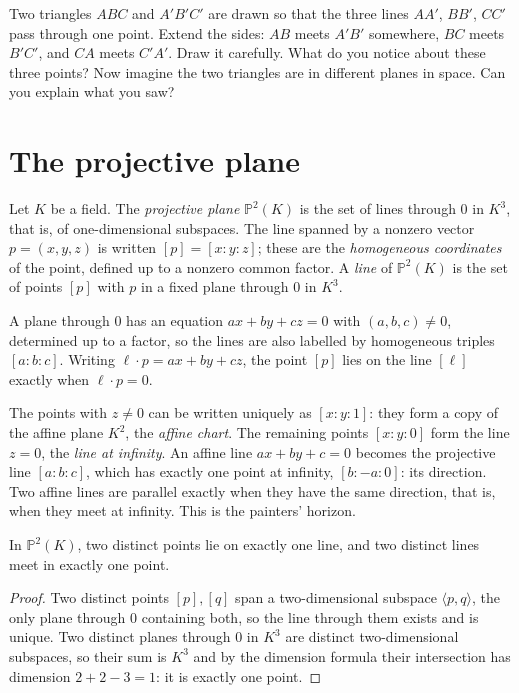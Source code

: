 \begin{think}
Two triangles $ABC$ and $A'B'C'$ are drawn so that the three lines $AA'$, $BB'$, $CC'$ pass through one point. Extend the sides: $AB$ meets
$A'B'$ somewhere, $BC$ meets $B'C'$, and $CA$ meets $C'A'$. Draw it carefully. What do you notice about these three points? Now imagine the two
triangles are in different planes in space. Can you explain what you saw?
\end{think}

\section{The projective plane}

\begin{definition}\label{def:projplane}
Let $K$ be a field. The \emph{projective plane} $\mathbb P^2(K)$ is the set of lines through $0$ in $K^3$, that is, of one-dimensional subspaces.
The line spanned by a nonzero vector $p=(x,y,z)$ is written $[p]=[x:y:z]$; these are the \emph{homogeneous coordinates} of the point, defined up
to a nonzero common factor. A \emph{line} of $\mathbb P^2(K)$ is the set of points $[p]$ with $p$ in a fixed plane through $0$ in $K^3$.
\end{definition}

A plane through $0$ has an equation $ax+by+cz=0$ with $(a,b,c)\ne0$, determined up to a factor, so the lines are also labelled by homogeneous
triples $[a:b:c]$. Writing $\ell\cdot p=ax+by+cz$, the point $[p]$ lies on the line $[\ell]$ exactly when $\ell\cdot p=0$.

The points with $z\ne0$ can be written uniquely as $[x:y:1]$: they form a copy of the affine plane $K^2$, the \emph{affine chart}. The
remaining points $[x:y:0]$ form the line $z=0$, the \emph{line at infinity}. An affine line $ax+by+c=0$ becomes the projective line $[a:b:c]$,
which has exactly one point at infinity, $[b:-a:0]$: its direction. Two affine lines are parallel exactly when they have the same direction, that
is, when they meet at infinity. This is the painters' horizon.

\begin{proposition}\label{prop:incidence}
In $\mathbb P^2(K)$, two distinct points lie on exactly one line, and two distinct lines meet in exactly one point.
\end{proposition}

\begin{proof}
Two distinct points $[p],[q]$ span a two-dimensional subspace $\langle p,q\rangle$, the only plane through $0$ containing both, so the line through
them exists and is unique. Two distinct planes through $0$ in $K^3$ are distinct two-dimensional subspaces, so their sum is $K^3$ and by the
dimension formula their intersection has dimension $2+2-3=1$: it is exactly one point.
\end{proof}

